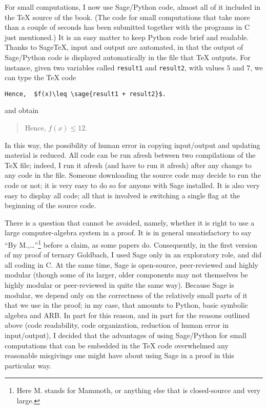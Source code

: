 For small computations, I now use Sage/Python code, almost all of it
included in the TeX source of the book. (The code for small computations that
take more than a couple of seconds has been submitted together with the programs
in C just mentioned.) It is an easy matter to keep Python
code brief and readable. Thanks to SageTeX, input and output are automated,
in that the output of Sage/Python code is displayed automatically in the 
file that TeX outputs. For instance, given two variables called \texttt{result1}
and \texttt{result2}, with values $5$ and $7$, we can type the TeX code
\begin{verbatim}
Hence,  $f(x)\leq \sage{result1 + result2}$.
\end{verbatim}
and obtain
\begin{quote}
  Hence, $f(x)\leq 12$.
\end{quote}
In this way, the possibility of human error in copying input/output and
updating material is reduced. All code can be run afresh between two
compilations of the TeX file; indeed, I run it afresh (and have to run it
afresh) after any change to any code in the file. Someone downloading the
source code may decide to run the code or not; it is very easy to do so
for anyone with Sage installed. It is also very easy to display all code;
all that is involved is switching
a single flag at the beginning of the source code.

There is a question that cannot be avoided, namely, whether
it is right to use a large computer-algebra system in a proof. It is in
general unsatisfactory to say ``By M.,\dots''\footnote{Here
  M. stands for Mammoth, or anything else that is closed-source and very large.} before a claim, as some
papers do. Consequently, in the first version of my proof of ternary
Goldbach, I used Sage only in an exploratory role, and did all coding in C.
At the same time, Sage is open-source, peer-reviewed and highly modular
(though some of its larger, older components may not themselves be highly
modular or peer-reviewed in quite the same way).
Because Sage is modular, we depend only on the correctness of the relatively
small parts of it that we use in the proof; in my case, that amounts to
Python, basic symbolic algebra and ARB.
In part for this reason, and in part for the reasons outlined above
(code readability, code organization,
reduction of human error in input/output),
I decided that the advantages of using Sage/Python for small computations
that can be embedded in the TeX code overwhelmed any reasonable misgivings
one might have about using Sage in a proof in this particular way.

